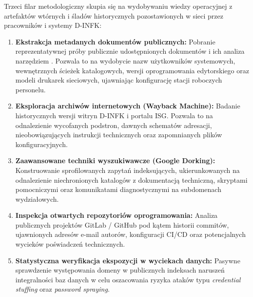 Trzeci filar metodologiczny skupia się na wydobywaniu wiedzy operacyjnej z artefaktów wtórnych i śladów historycznych pozostawionych w sieci przez pracowników i systemy D-INFK:
\begin{enumerate}
    \item \textbf{Ekstrakcja metadanych dokumentów publicznych:} Pobranie reprezentatywnej próby publicznie udostępnionych dokumentów i ich analiza narzędziem . Pozwala to na wydobycie nazw użytkowników systemowych, wewnętrznych ścieżek katalogowych, wersji oprogramowania edytorskiego oraz modeli drukarek sieciowych, ujawniając konfigurację stacji roboczych personelu.
    \item \textbf{Eksploracja archiwów internetowych (Wayback Machine):} Badanie historycznych wersji witryn D-INFK i portalu ISG. Pozwala to na odnalezienie wycofanych podstron, dawnych schematów adresacji, nieobowiązujących instrukcji technicznych oraz zapomnianych plików konfiguracyjnych.
    \item \textbf{Zaawansowane techniki wyszukiwawcze (Google Dorking):} Konstruowanie sprofilowanych zapytań indeksujących, ukierunkowanych na odnalezienie niechronionych katalogów z dokumentacją techniczną, skryptami pomocniczymi oraz komunikatami diagnostycznymi na subdomenach wydziałowych.
    \item \textbf{Inspekcja otwartych repozytoriów oprogramowania:} Analiza publicznych projektów GitLab / GitHub pod kątem historii commitów, ujawnionych adresów e-mail autorów, konfiguracji CI/CD oraz potencjalnych wycieków poświadczeń technicznych.
    \item \textbf{Statystyczna weryfikacja ekspozycji w wyciekach danych:} Pasywne sprawdzenie występowania domeny  w publicznych indeksach naruszeń integralności baz danych w celu oszacowania ryzyka ataków typu \textit{credential stuffing} oraz \textit{password spraying}.
\end{enumerate}
